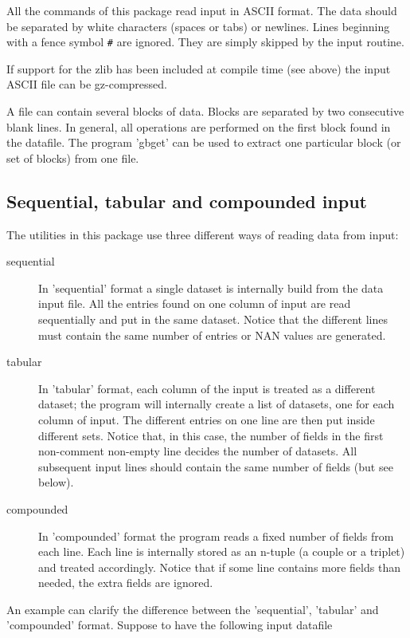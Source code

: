 \documentclass[11pt]{article}
\begin{document}
All the commands of this package read input in ASCII format. The data
should be separated by white characters (spaces or tabs) or
newlines. Lines beginning with a fence symbol \verb~#~ are ignored. They
are simply skipped by the input routine.

If support for the zlib has been included at compile time (see above)
the input ASCII file can be gz-compressed.

A file can contain several blocks of data. Blocks are separated by two
consecutive blank lines. In general, all operations are performed on
the first block found in the datafile. The program 'gbget' can be used
to extract one particular block (or set of blocks) from one file.


\subsection{Sequential, tabular and compounded input}
\label{sec-2-1}

The utilities in this package use three different ways of reading data
from input:

\begin{description}
\item[{sequential}] In 'sequential' format a single dataset is internally
build from the data input file. All the entries found
on one column of input are read sequentially and put
in the same dataset. Notice that the different lines
must contain the same number of entries or NAN values
are generated.

\item[{tabular}] In 'tabular' format, each column of the input is treated
as a different dataset; the program will internally
create a list of datasets, one for each column of
input. The different entries on one line are then put
inside different sets. Notice that, in this case, the
number of fields in the first non-comment non-empty line
decides the number of datasets. All subsequent input
lines should contain the same number of fields (but see
below).

\item[{compounded}] In 'compounded' format the program reads a fixed
number of fields from each line. Each line is
internally stored as an n-tuple (a couple or a
triplet) and treated accordingly. Notice that if some
line contains more fields than needed, the extra
fields are ignored.
\end{description}


An example can clarify the difference between the 'sequential',
'tabular' and 'compounded' format. Suppose to have the following input
datafile
\end{document}

